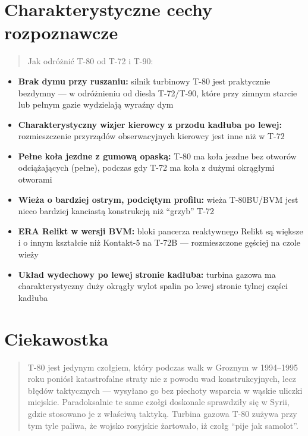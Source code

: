 \documentclass[12pt,openany,oneside]{book}
\providecommand{\tightlist}{%
  \setlength{\itemsep}{0pt}\setlength{\parskip}{0pt}}
\begin{document}
\section{Charakterystyczne cechy
rozpoznawcze}\label{charakterystyczne-cechy-rozpoznawcze-1}

\begin{quote}
Jak odróżnić T-80 od T-72 i T-90:
\end{quote}

\begin{itemize}
\tightlist
\item
  \textbf{Brak dymu przy ruszaniu:} silnik turbinowy T-80 jest
  praktycznie bezdymny --- w odróżnieniu od diesla T-72/T-90, które przy
  zimnym starcie lub pełnym gazie wydzielają wyraźny dym
\item
  \textbf{Charakterystyczny wizjer kierowcy z przodu kadłuba po lewej:}
  rozmieszczenie przyrządów obserwacyjnych kierowcy jest inne niż w T-72
\item
  \textbf{Pełne koła jezdne z gumową opaską:} T-80 ma koła jezdne bez
  otworów odciążających (pełne), podczas gdy T-72 ma koła z dużymi
  okrągłymi otworami
\item
  \textbf{Wieża o bardziej ostrym, podciętym profilu:} wieża T-80BU/BVM
  jest nieco bardziej kanciastą konstrukcją niż ``grzyb'' T-72
\item
  \textbf{ERA Relikt w wersji BVM:} bloki pancerza reaktywnego Relikt są
  większe i o innym kształcie niż Kontakt-5 na T-72B --- rozmieszczone
  gęściej na czole wieży
\item
  \textbf{Układ wydechowy po lewej stronie kadłuba:} turbina gazowa ma
  charakterystyczny duży okrągły wylot spalin po lewej stronie tylnej
  części kadłuba
\end{itemize}

\section{Ciekawostka}\label{ciekawostka-1}

\begin{quote}
T-80 jest jedynym czołgiem, który podczas walk w Groznym w 1994--1995
roku poniósł katastrofalne straty nie z powodu wad konstrukcyjnych, lecz
błędów taktycznych --- wysyłano go bez piechoty wsparcia w wąskie
uliczki miejskie. Paradoksalnie te same czołgi doskonale sprawdziły się
w Syrii, gdzie stosowano je z właściwą taktyką. Turbina gazowa T-80
zużywa przy tym tyle paliwa, że wojsko rosyjskie żartowało, iż czołg
``pije jak samolot''.
\end{quote}
\end{document}
